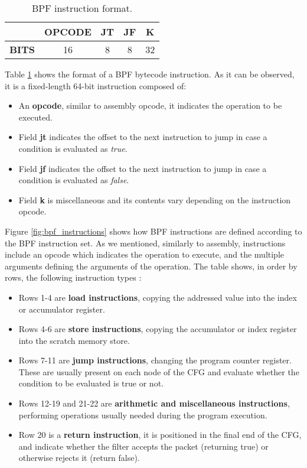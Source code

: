 \begin{table}[htbp]
\begin{tabular}{|c|c|c|c|c|}
\hline
& \textbf{OPCODE} & \textbf{JT} & \textbf{JF} & \textbf{K}\\
\hline
\textbf{BITS} & 16 & 8 & 8 & 32\\
\hline
\end{tabular}
\caption{BPF instruction format.}
\label{table:bpf_inst_format}
\end{table}

Table \ref{table:bpf_inst_format} shows the format of a BPF bytecode instruction. As it can be observed, it is a fixed-length 64-bit instruction composed of:
\begin{itemize}
\item An \textbf{opcode}, similar to assembly opcode, it indicates the operation to be executed.
\item Field \textbf{jt} indicates the offset to the next instruction to jump in case a condition is evaluated as \textit{true}.
\item Field \textbf{jf} indicates the offset to the next instruction to jump in case a condition is evaluated as \textit{false}.
\item Field \textbf{k} is miscellaneous and its contents vary depending on the instruction opcode.
\end{itemize}

Figure \ref{fig:bpf_instructions} shows how BPF instructions are defined according to the BPF instruction set. As we mentioned, similarly to assembly, instructions include an opcode which indicates the operation to execute, and the multiple arguments defining the arguments of the operation. The table shows, in order by rows, the following instruction types \cite{bpf_bsd_origin_bpf_page8}:
\begin{itemize}
\item Rows 1-4 are \textbf{load instructions}, copying the addressed value into the index or accumulator register.
\item Rows 4-6 are \textbf{store instructions}, copying the accumulator or index register into the scratch memory store.
\item Rows 7-11 are \textbf{jump instructions}, changing the program counter register. These are usually present on each node of the CFG and evaluate whether the condition to be evaluated is true or not.
\item Rows 12-19 and 21-22 are \textbf{arithmetic and miscellaneous instructions}, performing operations usually needed during the program execution.
\item Row 20 is a \textbf{return instruction}, it is positioned in the final end of the CFG, and indicate whether the filter accepts the packet (returning true) or otherwise rejects it (return false).
\end{itemize}

